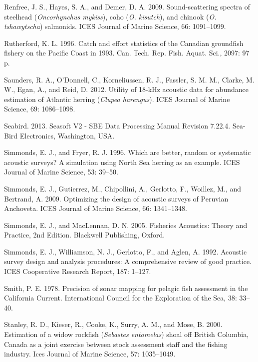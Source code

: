 \documentclass[]{article}
\begin{document}
\leavevmode\hypertarget{ref-Renfree2009}{}%
Renfree, J. S., Hayes, S. A., and Demer, D. A. 2009. Sound-scattering spectra of steelhead (\emph{Oncorhynchus mykiss}), coho (\emph{O. kisutch}), and chinook (\emph{O. tshawytscha}) salmonids. ICES Journal of Marine Science, 66: 1091--1099.

\leavevmode\hypertarget{ref-Rutherford1996}{}%
Rutherford, K. L. 1996. Catch and effort statistics of the Canadian groundfish fishery on the Pacific Coast in 1993. Can. Tech. Rep. Fish. Aquat. Sci., 2097: 97 p.

\leavevmode\hypertarget{ref-Saunders2012}{}%
Saunders, R. A., O'Donnell, C., Korneliussen, R. J., Fassler, S. M. M., Clarke, M. W., Egan, A., and Reid, D. 2012. Utility of 18-kHz acoustic data for abundance estimation of Atlantic herring (\emph{Clupea harengus}). ICES Journal of Marine Science, 69: 1086--1098.

\leavevmode\hypertarget{ref-Seabird2013}{}%
Seabird. 2013. Seasoft V2 - SBE Data Processing Manual Revision 7.22.4. Sea-Bird Electronics, Washington, USA.

\leavevmode\hypertarget{ref-Simmonds1996}{}%
Simmonds, E. J., and Fryer, R. J. 1996. Which are better, random or systematic acoustic surveys? A simulation using North Sea herring as an example. ICES Journal of Marine Science, 53: 39--50.

\leavevmode\hypertarget{ref-Simmonds2009}{}%
Simmonds, E. J., Gutierrez, M., Chipollini, A., Gerlotto, F., Woillez, M., and Bertrand, A. 2009. Optimizing the design of acoustic surveys of Peruvian Anchoveta. ICES Journal of Marine Science, 66: 1341--1348.

\leavevmode\hypertarget{ref-Simmonds2005}{}%
Simmonds, E. J., and MacLennan, D. N. 2005. Fisheries Acoustics: Theory and Practice, 2nd Edition. Blackwell Publishing, Oxford.

\leavevmode\hypertarget{ref-Simmonds1992}{}%
Simmonds, E. J., Williamson, N. J., Gerlotto, F., and Aglen, A. 1992. Acoustic survey design and analysis procedures: A comprehensive review of good practice. ICES Cooperative Research Report, 187: 1--127.

\leavevmode\hypertarget{ref-Smith1978}{}%
Smith, P. E. 1978. Precision of sonar mapping for pelagic fish assessment in the California Current. International Council for the Exploration of the Sea, 38: 33--40.

\leavevmode\hypertarget{ref-Stanley2000}{}%
Stanley, R. D., Kieser, R., Cooke, K., Surry, A. M., and Mose, B. 2000. Estimation of a widow rockfish (\emph{Sebastes entomelas}) shoal off British Columbia, Canada as a joint exercise between stock assessment staff and the fishing industry. Ices Journal of Marine Science, 57: 1035--1049.
\end{document}

